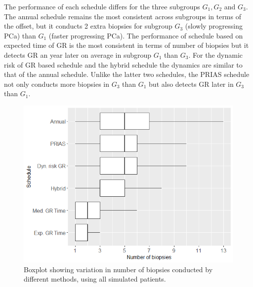 The performance of each schedule differs for the three subgroups $G_1, G_2$ and $G_3$. The annual schedule remains the most consistent across subgroups in terms of the offset, but it conducts 2 extra biopsies for subgroup $G_3$ (slowly progressing PCa) than $G_1$ (faster progressing PCa). The performance of schedule based on expected time of GR is the most consistent in terms of number of biopsies but it detects GR an year later on average in subgroup $G_1$ than $G_3$. For the dynamic risk of GR based schedule and the hybrid schedule the dynamics are similar to that of the annual schedule. Unlike the latter two schedules, the PRIAS schedule not only conducts more biopsies in $G_3$ than $G_1$ but also detects GR later in $G_3$ than $G_1$.

\begin{figure}[!htb]
\centerline{\includegraphics[width=\columnwidth]{images/sim_study/nbBoxPlot_all.png}}
\caption{Boxplot showing variation in number of biopsies conducted by different methods, using all simulated patients.}
\label{fig : nbBoxPlot_all}
\end{figure}

